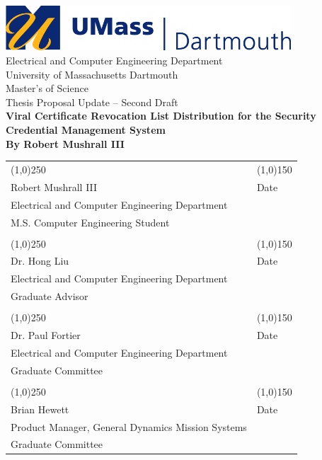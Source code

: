 \documentclass {article}
\begin{document}

\begin{titlepage}
	\centering
	\includegraphics[width=0.8\textwidth]{images/umd_logo.jpg} \\ \bigskip
	\LARGE{Electrical and Computer Engineering Department \\University of Massachusetts Dartmouth}\\
	\bigskip 
	\LARGE{Master's of Science \\ Thesis Proposal Update -- Second Draft} \\
	\bigskip 
	\Huge{\bf Viral Certificate Revocation List Distribution for the Security Credential Management System} \\ \medskip
	\LARGE{\bf By Robert Mushrall III}

	\vfill
	\begin{table}[!hb]
		\centering
		\begin{tabular}{ l l }
			\line(1,0){250} & \line(1,0){150} \\
			\small{Robert Mushrall III}  & \small{Date} \\
			\small{Electrical and Computer Engineering Department} \\
			\small{M.S. Computer Engineering Student} & \\
			\vspace{.3cm} \\
			\line(1,0){250} & \line(1,0){150} \\
			\small{Dr. Hong Liu} & \small{Date} \\
			\small{Electrical and Computer Engineering Department} \\
			\small{Graduate Advisor} & \\
			\vspace{.3cm} \\
			\line(1,0){250} & \line(1,0){150} \\
			\small{Dr. Paul Fortier} & \small{Date} \\
			\small{Electrical and Computer Engineering Department} \\
			\small{Graduate Committee} & \\
			\vspace{.3cm} \\
			\line(1,0){250} & \line(1,0){150} \\
			\small{Brian Hewett} & \small{Date} \\
			\small{Product Manager, General Dynamics Mission Systems} \\
			\small{Graduate Committee} & \\
		\end{tabular}
	\end{table}
	\thispagestyle{empty}
\end{titlepage}
\setcounter{page}{2}
\end{document}
